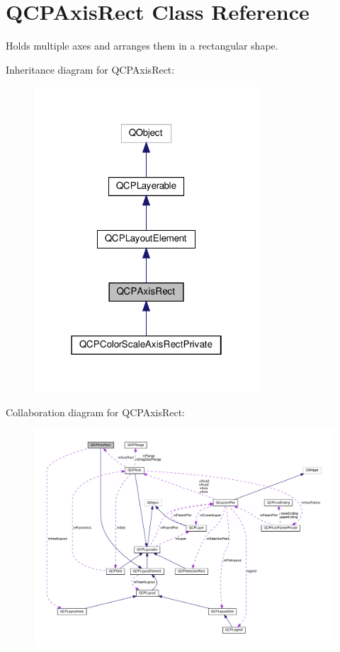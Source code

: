 \hypertarget{classQCPAxisRect}{}\section{Q\+C\+P\+Axis\+Rect Class Reference}
\label{classQCPAxisRect}


Holds multiple axes and arranges them in a rectangular shape.  




Inheritance diagram for Q\+C\+P\+Axis\+Rect\+:\nopagebreak
\begin{figure}[H]
\begin{center}
\leavevmode
\includegraphics[width=238pt]{classQCPAxisRect__inherit__graph}
\end{center}
\end{figure}


Collaboration diagram for Q\+C\+P\+Axis\+Rect\+:\nopagebreak
\begin{figure}[H]
\begin{center}
\leavevmode
\includegraphics[width=350pt]{classQCPAxisRect__coll__graph}
\end{center}
\end{figure}
